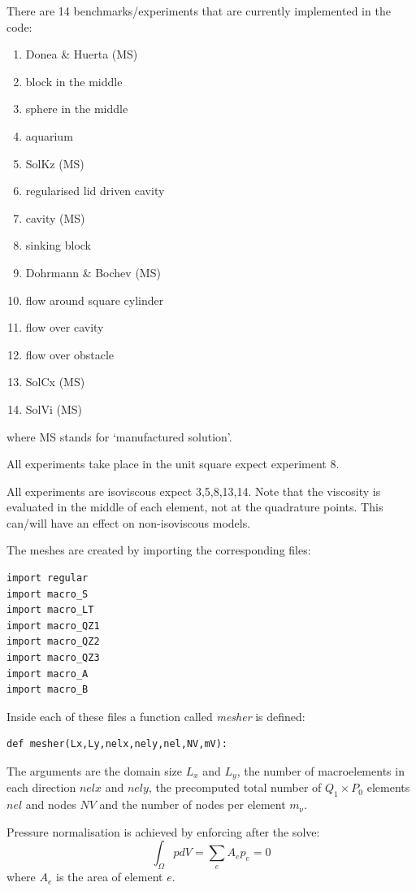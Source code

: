 There are 14 benchmarks/experiments that are currently implemented in the code:
\begin{enumerate}
\item Donea \& Huerta (MS) %
\item block in the middle %
\item sphere in the middle %
\item aquarium %
\item SolKz (MS) %
\item regularised lid driven cavity %
\item cavity (MS) %
\item sinking block %
\item Dohrmann \& Bochev (MS) \cite{dobo04} %
\item flow around square cylinder %
\item flow over cavity %
\item flow over obstacle %
\item SolCx (MS) %
\item SolVi (MS) %
\end{enumerate}
where MS stands for `manufactured solution'.

All experiments take place in the unit square expect experiment 8.

All experiments are isoviscous expect 3,5,8,13,14.
Note that the viscosity is evaluated in the middle of each element, not 
at the quadrature points. This can/will have an effect on non-isoviscous models.

\newpage
The meshes are created by importing the corresponding files:
\begin{lstlisting} 
import regular
import macro_S
import macro_LT
import macro_QZ1 
import macro_QZ2
import macro_QZ3
import macro_A
import macro_B
\end{lstlisting} 
Inside each of these files a function called {\sl mesher} is defined: 
\begin{lstlisting} 
def mesher(Lx,Ly,nelx,nely,nel,NV,mV):
\end{lstlisting} 
The arguments are the domain size $L_x$ and $L_y$, the number of macroelements
in each direction $nelx$ and $nely$, the precomputed total number of $Q_1\times P_0$ 
elements $nel$ and nodes $NV$ and the number of nodes per element $m_\upnu$.  

Pressure normalisation is achieved by enforcing after the solve:
\[
\int_\Omega p dV = \sum_e A_e p_e = 0
\]
where $A_e$ is the area of element $e$.

